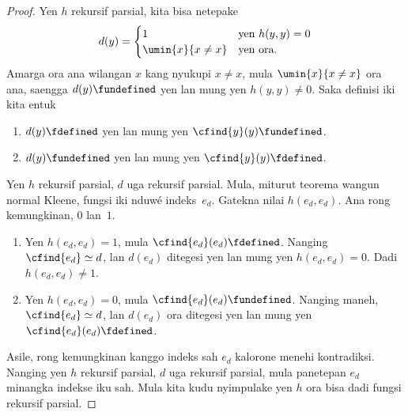 \documentclass[../../../include/open-logic-section]{subfiles}
\begin{document}
\begin{proof}
Yen $h$ rekursif parsial, kita bisa netepake
\[
d(y) =
\begin{cases}
1 & \text{yen $h(y, y) = 0$}\\
\umin{x}{x \neq x} & \text{yen ora.}
\end{cases}
\]
Amarga ora ana wilangan $x$ kang nyukupi $x \neq x$,
mula $\umin{x}{x \neq x}$ ora ana, saengga
$d(y) \fundefined$ yen lan mung yen $h(y,y) \neq 0$.
Saka definisi iki kita entuk
\begin{enumerate}
\item $d(y) \fdefined$ yen lan mung yen
  $\cfind{y}(y) \fundefined$.
\item $d(y) \fundefined$ yen lan mung yen
  $\cfind{y}(y) \fdefined$.
\end{enumerate}
Yen $h$ rekursif parsial, $d$ uga rekursif parsial.
Mula, miturut teorema wangun normal Kleene,
fungsi iki nduwé indeks~$e_d$. Gatekna nilai
$h(e_d, e_d)$. Ana rong kemungkinan, $0$
lan~$1$.
\begin{enumerate}
\item Yen $h(e_d, e_d) = 1$, mula
  $\cfind{e_d}(e_d) \fdefined$. Nanging
  $\cfind{e_d} \simeq d$, lan $d(e_d)$
  ditegesi yen lan mung yen $h(e_d, e_d) = 0$.
  Dadi $h(e_d, e_d) \neq 1$.
\item Yen $h(e_d, e_d) = 0$, mula
  $\cfind{e_d}(e_d) \fundefined$. Nanging maneh,
  $\cfind{e_d} \simeq d$, lan $d(e_d)$ ora
  ditegesi yen lan mung yen
  $\cfind{e_d}(e_d) \fdefined$.
\end{enumerate}
 Asile, rong kemungkinan kanggo indeks sah $e_d$ kalorone menehi kontradiksi. Nanging yen $h$
rekursif parsial, $d$ uga rekursif parsial,
mula panetepan $e_d$ minangka indekse iku sah.
Mula kita kudu nyimpulake yen $h$ ora bisa
dadi fungsi rekursif parsial.
\end{proof}
\end{document}
